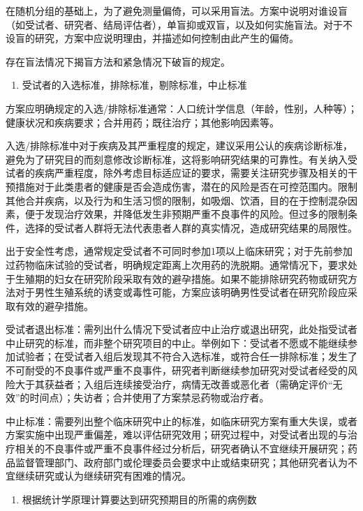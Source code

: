 \documentclass[
  chinese-hans,
  letterpaper,
  DIV=11,
  numbers=noendperiod]{scrreprt}
\providecommand{\tightlist}{%
  \setlength{\itemsep}{0pt}\setlength{\parskip}{0pt}}
\begin{document}
在随机分组的基础上，为了避免测量偏倚，可以采用盲法。方案中说明对谁设盲（如受试者、研究者、结局评估者），单盲抑或双盲，以及如何实施盲法。对于不设盲的研究，方案中应说明理由，并描述如何控制由此产生的偏倚。

存在盲法情况下揭盲方法和紧急情况下破盲的规定。

\begin{enumerate}
\def\labelenumi{\arabic{enumi}.}
\setcounter{enumi}{3}
\tightlist
\item
  受试者的入选标准，排除标准，剔除标准，中止标准
\end{enumerate}

方案应明确规定的入选/排除标准通常：人口统计学信息（年龄，性别，人种等）；健康状况和疾病要求；合并用药；既往治疗；其他影响因素等。

入选/排除标准中对于疾病及其严重程度的规定，建议采用公认的疾病诊断标准，避免为了研究目的而刻意修改诊断标准，这将影响研究结果的可靠性。有关纳入受试者的疾病严重程度，除外考虑目标适应证的要求，需要关注研究步骤及相关的干预措施对于此类患者的健康是否会造成伤害，潜在的风险是否在可控范围内。限制其他合并疾病，以及行为和生活习惯的限制，如吸烟、饮酒，目的在于控制混杂因素，便于发现治疗效果，并降低发生非预期严重不良事件的风险。但过多的限制条件，选择的受试者人群将无法代表患者人群的真实情况，造成研究结果的局限性。

出于安全性考虑，通常规定受试者不可同时参加1项以上临床研究；对于先前参加过药物临床试验的受试者，明确规定距离上次用药的洗脱期。通常情况下，要求处于生殖期的妇女在研究阶段采取有效的避孕措施。如果不能排除研究药物或研究方法对于男性生殖系统的诱变或毒性可能，方案应该明确男性受试者在研究阶段应采取有效的避孕措施。

受试者退出标准：需列出什么情况下受试者应中止治疗或退出研究，此处指受试者中止研究的标准，而非整个研究项目的中止。举例如下：受试者不愿或不能继续参加试验者；在受试者入组后发现其不符合入选标准，或符合任一排除标准；发生了不可耐受的不良事件或严重不良事件，研究者判断继续参加研究对受试者经受的风险大于其获益者；入组后连续接受治疗，病情无改善或恶化者（需确定评价``无效''的时间点）；失访者；合并使用了方案禁忌药物或治疗者。

中止标准：需要列出整个临床研究中止的标准，如临床研究方案有重大失误，或者方案实施中出现严重偏差，难以评估研究效用；研究过程中，对受试者出现的与治疗相关的不良事件或严重不良事件经过分析后，研究者确认不宜继续开展研究；药品监督管理部门、政府部门或伦理委员会要求中止或结束研究；其他研究者认为不宜继续研究或认为继续研究有困难的情况。

\begin{enumerate}
\def\labelenumi{\arabic{enumi}.}
\setcounter{enumi}{4}
\tightlist
\item
  根据统计学原理计算要达到研究预期目的所需的病例数
\end{enumerate}
\end{document}
